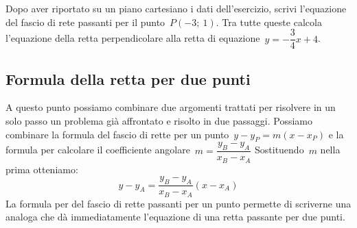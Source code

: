  \begin{esempio}
  Dopo aver riportato su un piano cartesiano i dati dell'esercizio,
  scrivi l'equazione del fascio di rete passanti per il punto~\(P(-3;~1)\).
  Tra tutte queste calcola l'equazione della retta perpendicolare alla retta 
  di equazione~\(y=-\dfrac{3}{4}x+4\).

\begin{inaccessibleblock}
 \begin{figure}[h]
 \centering
{}
\label{fig:metodorapido}
\end{figure}
\end{inaccessibleblock}
 \end{esempio}

\subsection{Formula della retta per due punti}

A questo punto possiamo combinare due argomenti trattati per risolvere in un
solo passo un problema già affrontato e risolto in due passaggi. 
Possiamo combinare la formula del fascio di rette per un 
punto~\(y - y_P = m (x - x_P)\)
e la formula per calcolare il 
coefficiente angolare~\(m = \dfrac{y_B - y_A}{x_B - x_A}\) 
Sostituendo~\(m\) nella prima otteniamo:
\[y - y_A = \dfrac{y_B - y_A}{x_B - x_A} (x - x_A)\]
La formula per del fascio di rette passanti per un punto permette di 
scriverne una analoga che dà immediatamente l'equazione di una retta passante 
per due punti.

